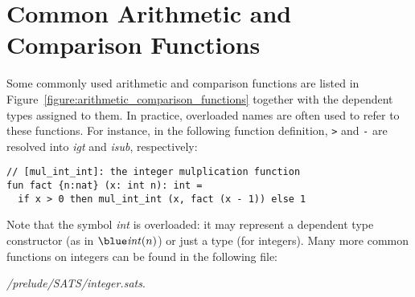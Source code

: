 \section{Common Arithmetic and Comparison Functions}
Some commonly used arithmetic and comparison functions are listed in
Figure~\ref{figure:arithmetic_comparison_functions} together with the
dependent types assigned to them. In practice, overloaded names are often
used to refer to these functions. For instance, in the following function
definition, {\it\verb`>`} and {\it \verb`-`} are resolved into {\it igt}
and {\it isub}, respectively:
\begin{verbatim}
// [mul_int_int]: the integer mulplication function
fun fact {n:nat} (x: int n): int =
  if x > 0 then mul_int_int (x, fact (x - 1)) else 1
\end{verbatim}
Note that the symbol {\it int} is overloaded: it may represent a dependent
type constructor (as in $\tint(n)$) or just a type (for integers).  Many
more common functions on integers can be found in the following file:
\begin{center}
{\it\ATSHOME/prelude/SATS/integer.sats}.
\end{center}

